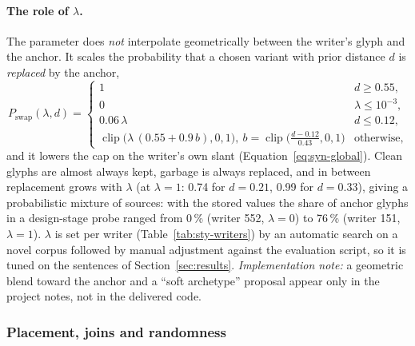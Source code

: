 \paragraph{The role of $\lambda$.}
The parameter does \emph{not} interpolate geometrically between the writer's glyph and the anchor.
It scales the probability that a chosen variant with prior distance $d$ is \emph{replaced} by the anchor,
\begin{equation}
P_{\mathrm{swap}}(\lambda,d)=\begin{cases}1&d\ge0.55,\\0&\lambda\le10^{-3},\\0.06\,\lambda&d\le0.12,\\\operatorname{clip}\bigl(\lambda\,(0.55+0.9\,b),0,1\bigr),\ b=\operatorname{clip}\bigl(\tfrac{d-0.12}{0.43},0,1\bigr)&\text{otherwise,}\end{cases}
\label{eq:syn-swap}
\end{equation}
and it lowers the cap on the writer's own slant (Equation~\ref{eq:syn-global}).
Clean glyphs are almost always kept, garbage is always replaced, and in between replacement grows with $\lambda$ (at $\lambda=1$: 0.74 for $d=0.21$, 0.99 for $d=0.33$), giving a probabilistic mixture of sources: with the stored values the share of anchor glyphs in a design-stage probe ranged from 0\,\% (writer 552, $\lambda=0$) to 76\,\% (writer 151, $\lambda=1$).
$\lambda$ is set per writer (Table~\ref{tab:sty-writers}) by an automatic search on a novel corpus followed by manual adjustment against the evaluation script, so it is tuned on the sentences of Section~\ref{sec:results}.
\emph{Implementation note:} a geometric blend toward the anchor and a ``soft archetype'' proposal appear only in the project notes, not in the delivered code.

\subsubsection{Placement, joins and randomness}

